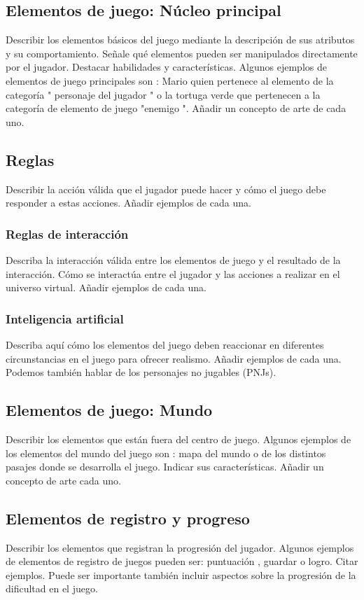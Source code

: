 \subsection{Elementos de juego: Núcleo principal}
Describir los elementos básicos del juego mediante la descripción de sus atributos y su comportamiento. Señale qué elementos pueden ser manipulados directamente por el jugador. Destacar habilidades y características. Algunos ejemplos de elementos de juego principales son : Mario quien pertenece al elemento de la categoría " personaje del jugador " o la tortuga verde que pertenecen a la categoría de elemento de juego "enemigo ". Añadir un concepto de arte de cada uno.

\subsection{Reglas}
Describir la acción válida que el jugador puede hacer y cómo el juego debe responder a estas acciones. Añadir ejemplos de cada una.

\subsubsection{Reglas de interacción}
Describa la interacción válida entre los elementos de juego y el resultado de la interacción. Cómo se interactúa entre el jugador y las acciones a realizar en el universo virtual. Añadir ejemplos de cada una.

\subsubsection{Inteligencia artificial}
Describa aquí cómo los elementos del juego deben reaccionar en diferentes circunstancias en el juego para ofrecer realismo. Añadir ejemplos de cada una. Podemos también hablar de los personajes no jugables (PNJs).

\subsection{Elementos de juego: Mundo}
Describir los elementos que están fuera del centro de juego. Algunos ejemplos de los elementos del mundo del juego son : mapa del mundo o de los distintos pasajes donde se desarrolla el juego. Indicar sus características. Añadir un concepto de arte cada uno.

\subsection{Elementos de registro y progreso}
Describir los elementos que registran la progresión del jugador. Algunos ejemplos de elementos de registro de juegos pueden ser: puntuación , guardar o logro. Citar ejemplos. Puede ser importante también incluir aspectos sobre la progresión de la dificultad en el juego.

